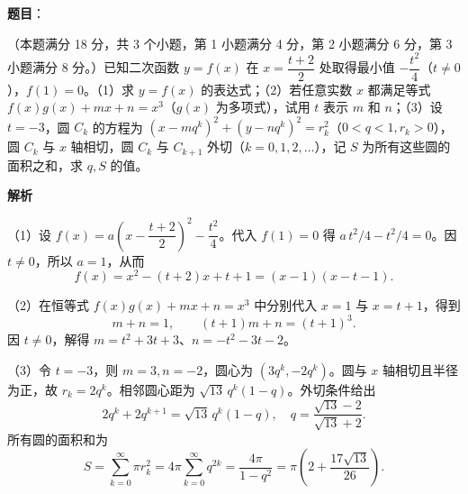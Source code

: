 \begin{answer}

\textbf{题目}：

（本题满分 18 分，共 3 个小题，第 1 小题满分 4 分，第 2 小题满分 6 分，第 3 小题满分 8 分。）已知二次函数 $y=f(x)$ 在 $x=\dfrac{t+2}{2}$ 处取得最小值 $-\dfrac{t^2}{4}$（$t\ne0$），$f(1)=0$。（1）求 $y=f(x)$ 的表达式；（2）若任意实数 $x$ 都满足等式 $f(x)g(x)+mx+n=x^3$（$g(x)$ 为多项式），试用 $t$ 表示 $m$ 和 $n$；（3）设 $t=-3$，圆 $C_k$ 的方程为 $(x-mq^k)^2+(y-nq^k)^2=r_k^2$（$0<q<1,r_k>0$），圆 $C_k$ 与 $x$ 轴相切，圆 $C_k$ 与 $C_{k+1}$ 外切（$k=0,1,2,\ldots$），记 $S$ 为所有这些圆的面积之和，求 $q,S$ 的值。

\textbf{解析}

（1）设 $f(x)=a\left(x-\dfrac{t+2}{2}\right)^2-\dfrac{t^2}{4}$。代入 $f(1)=0$ 得 $a\,t^2/4-t^2/4=0$。因 $t\ne0$，所以 $a=1$，从而
\nopagebreak[4]
\[
f(x)=x^2-(t+2)x+t+1=(x-1)(x-t-1).
\]

（2）在恒等式 $f(x)g(x)+mx+n=x^3$ 中分别代入 $x=1$ 与 $x=t+1$，得到
\nopagebreak[4]
\[
m+n=1,\qquad (t+1)m+n=(t+1)^3.
\]
因 $t\ne0$，解得 $m=t^2+3t+3$、$n=-t^2-3t-2$。

（3）令 $t=-3$，则 $m=3,n=-2$，圆心为 $(3q^k,-2q^k)$。圆与 $x$ 轴相切且半径为正，故 $r_k=2q^k$。相邻圆心距为 $\sqrt{13}\,q^k(1-q)$。外切条件给出
\nopagebreak[4]
\[
2q^k+2q^{k+1}=\sqrt{13}\,q^k(1-q),
\quad q=\frac{\sqrt{13}-2}{\sqrt{13}+2}.
\]
所有圆的面积和为
\nopagebreak[4]
\[
S=\sum_{k=0}^{\infty}\pi r_k^2
=4\pi\sum_{k=0}^{\infty}q^{2k}
=\frac{4\pi}{1-q^2}
=\pi\left(2+\frac{17\sqrt{13}}{26}\right).
\]


\end{answer}